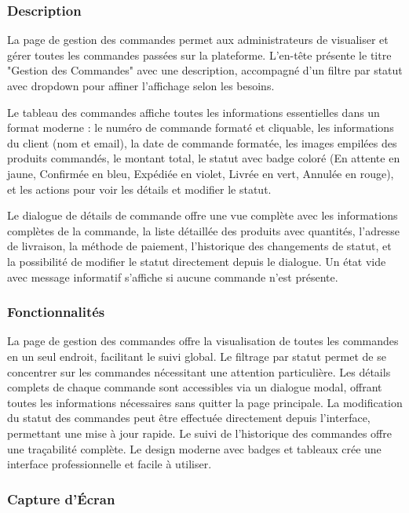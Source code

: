 \documentclass[12pt,a4paper]{article}
\begin{document}
\subsubsection{Description}

La page de gestion des commandes permet aux administrateurs de visualiser et gérer toutes les commandes passées sur la plateforme. L'en-tête présente le titre "Gestion des Commandes" avec une description, accompagné d'un filtre par statut avec dropdown pour affiner l'affichage selon les besoins.

Le tableau des commandes affiche toutes les informations essentielles dans un format moderne : le numéro de commande formaté et cliquable, les informations du client (nom et email), la date de commande formatée, les images empilées des produits commandés, le montant total, le statut avec badge coloré (En attente en jaune, Confirmée en bleu, Expédiée en violet, Livrée en vert, Annulée en rouge), et les actions pour voir les détails et modifier le statut.

Le dialogue de détails de commande offre une vue complète avec les informations complètes de la commande, la liste détaillée des produits avec quantités, l'adresse de livraison, la méthode de paiement, l'historique des changements de statut, et la possibilité de modifier le statut directement depuis le dialogue. Un état vide avec message informatif s'affiche si aucune commande n'est présente.

\subsubsection{Fonctionnalités}

La page de gestion des commandes offre la visualisation de toutes les commandes en un seul endroit, facilitant le suivi global. Le filtrage par statut permet de se concentrer sur les commandes nécessitant une attention particulière. Les détails complets de chaque commande sont accessibles via un dialogue modal, offrant toutes les informations nécessaires sans quitter la page principale. La modification du statut des commandes peut être effectuée directement depuis l'interface, permettant une mise à jour rapide. Le suivi de l'historique des commandes offre une traçabilité complète. Le design moderne avec badges et tableaux crée une interface professionnelle et facile à utiliser.

\subsubsection{Capture d'Écran}
\end{document}
